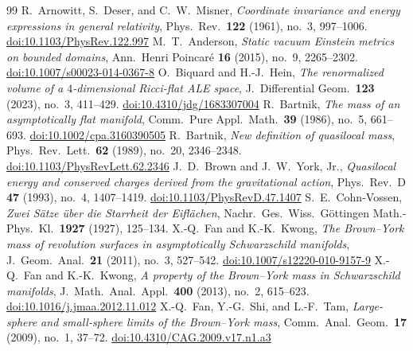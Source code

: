 \documentclass[10pt,a4paper]{amsart}
\begin{document}
\begin{thebibliography}{99}
 R.~Arnowitt, S.~Deser, and C.~W.~Misner, \emph{Coordinate invariance and energy expressions in general relativity}, Phys.\ Rev.\ \textbf{122} (1961), no.~3, 997--1006. \href{https://doi.org/10.1103/PhysRev.122.997}{doi:10.1103/PhysRev.122.997}
 M.~T.~Anderson, \emph{Static vacuum Einstein metrics on bounded domains}, Ann.\ Henri Poincar\'e \textbf{16} (2015), no.~9, 2265--2302. \href{https://doi.org/10.1007/s00023-014-0367-8}{doi:10.1007/s00023-014-0367-8}
 O.~Biquard and H.-J.~Hein, \emph{The renormalized volume of a $4$-dimensional Ricci-flat ALE space}, J.\ Differential Geom.\ \textbf{123} (2023), no.~3, 411--429. \href{https://doi.org/10.4310/jdg/1683307004}{doi:10.4310/jdg/1683307004}
 R.~Bartnik, \emph{The mass of an asymptotically flat manifold}, Comm.\ Pure Appl.\ Math.\ \textbf{39} (1986), no.~5, 661--693. \href{https://doi.org/10.1002/cpa.3160390505}{doi:10.1002/cpa.3160390505}
 R.~Bartnik, \emph{New definition of quasilocal mass}, Phys.\ Rev.\ Lett.\ \textbf{62} (1989), no.~20, 2346--2348. \href{https://doi.org/10.1103/PhysRevLett.62.2346}{doi:10.1103/PhysRevLett.62.2346}
 J.~D.~Brown and J.~W.~York, Jr., \emph{Quasilocal energy and conserved charges derived from the gravitational action}, Phys.\ Rev.\ D \textbf{47} (1993), no.~4, 1407--1419. \href{https://doi.org/10.1103/PhysRevD.47.1407}{doi:10.1103/PhysRevD.47.1407}
 S.~E.~Cohn-Vossen, \emph{Zwei S\"atze \"uber die Starrheit der Eifl\"achen}, Nachr.\ Ges.\ Wiss.\ G\"ottingen Math.-Phys.\ Kl.\ \textbf{1927} (1927), 125--134.
 X.-Q.~Fan and K.-K.~Kwong, \emph{The Brown--York mass of revolution surfaces in asymptotically Schwarzschild manifolds}, J.\ Geom.\ Anal.\ \textbf{21} (2011), no.~3, 527--542. \href{https://doi.org/10.1007/s12220-010-9157-9}{doi:10.1007/s12220-010-9157-9}
 X.-Q.~Fan and K.-K.~Kwong, \emph{A property of the Brown--York mass in Schwarzschild manifolds}, J.\ Math.\ Anal.\ Appl.\ \textbf{400} (2013), no.~2, 615--623. \href{https://doi.org/10.1016/j.jmaa.2012.11.012}{doi:10.1016/j.jmaa.2012.11.012}
 X.-Q.~Fan, Y.-G.~Shi, and L.-F.~Tam, \emph{Large-sphere and small-sphere limits of the Brown--York mass}, Comm.\ Anal.\ Geom.\ \textbf{17} (2009), no.~1, 37--72. \href{https://doi.org/10.4310/CAG.2009.v17.n1.a3}{doi:10.4310/CAG.2009.v17.n1.a3}

\end{thebibliography}
\end{document}
